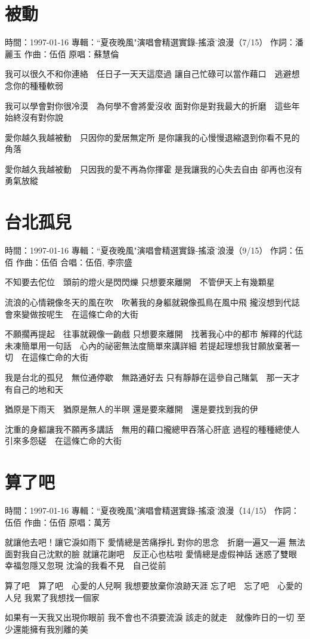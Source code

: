\documentclass[UTF8,a4paper,oneside,twocolumn,12pt]{ctexbook}
\newcommand{\infopair}[2]{\textbullet #1：#2}
\newcommand{\zc}[1][伍佰]{\infopair{作詞}{#1}}
\newcommand{\zq}[1][伍佰]{\infopair{作曲}{#1}}
\newcommand{\zj}[1]{\infopair{專輯}{#1}}
\newcommand{\yc}[1]{\infopair{原唱}{#1}}
\newcommand{\sj}[1]{\infopair{時間}{#1}}
\newenvironment{info}{\begin{flushleft}\kaishu
	}
	{\end{flushleft}\normalsize\yahei\par}
\newenvironment{lyric}{
	}
{}
\begin{document}
\section{被動}
\begin{info}
	\sj{1997-01-16}
	\zj{``夏夜晚風"演唱會精選實錄-搖滾˙浪漫（7/15）}
	\zc[潘麗玉]
	\zq
	\yc{蘇慧倫}
\end{info}
\begin{lyric}
	我可以很久不和你連絡　任日子一天天這麼過
	讓自己忙碌可以當作藉口　逃避想念你的種種軟弱

	我可以學會對你很冷漠　為何學不會將愛沒收
	面對你是對我最大的折磨　這些年始終沒有對你說

	愛你越久我越被動　只因你的愛居無定所
	是你讓我的心慢慢退縮退到你看不見的角落

	愛你越久我越被動　只因我的愛不再為你揮霍
	是我讓我的心失去自由  卻再也沒有勇氣放縱
\end{lyric}

\section{台北孤兒}
\begin{info}
	\sj{1997-01-16}
	\zj{``夏夜晚風"演唱會精選實錄-搖滾˙浪漫（9/15）}
	\zc
	\zq
	\infopair{合唱}{伍佰, 李宗盛}
\end{info}
\begin{lyric}
	不知要去佗位　頭前的燈火是閃閃爍
	只想要來離開　不管伊天上有幾顆星

	流浪的心情親像冬天的風在吹　吹著我的身軀就親像孤鳥在風中飛
	攏沒想到代誌會來變做按呢生　在這條亡命的大街

	不願擱再提起　往事就親像一齣戲
	只想要來離開　找著我心中的都市
	解釋的代誌未凍簡單用一句話　心內的祕密無法度簡單來講詳細
	若提起理想我甘願放棄著一切　在這條亡命的大街

	我是台北的孤兒　無位通停歇　無路通好去
	只有靜靜在這參自己賭氣　那一天才有自己的地和天

	猶原是下雨天　猶原是無人的半暝
	還是要來離開　還是要找到我的伊

	沈重的身軀讓我不願再多講話　無用的藉口攏總甲吞落心肝底
	過程的種種總使人引來多怨磋　在這條亡命的大街
\end{lyric}

\section{算了吧}
\begin{info}
	\sj{1997-01-16}
	\zj{``夏夜晚風"演唱會精選實錄-搖滾˙浪漫（14/15）}
	\zc
	\zq
	\yc{萬芳}
\end{info}
\begin{lyric}
	就讓他去吧！讓它淚如雨下
	愛情總是苦痛掙扎
	對你的思念　折磨一遍又一遍
	無法面對我自己沈默的臉
	就讓花謝吧　反正心也枯啦
	愛情總是虛假神話
	迷惑了雙眼　幸福忽隱又忽現
	沈淪的我看不見　自己從前

	算了吧　算了吧　心愛的人兒啊
	我想要放棄你浪跡天涯
	忘了吧　忘了吧　心愛的人兒
	我累了我想找一個家

	如果有一天我又出現你眼前
	我不會也不須要流淚
	該走的就走　就像昨日的一切
	至少還能擁有我別離的美
\end{lyric}
\end{document}

